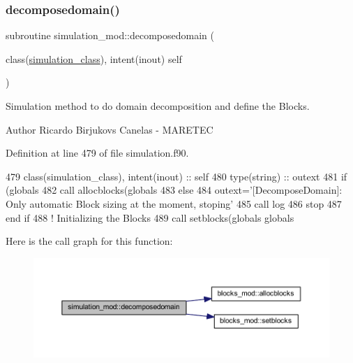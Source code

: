 \subsubsection{\texorpdfstring{decomposedomain()}{decomposedomain()}}
{\footnotesize\ttfamily subroutine simulation\+\_\+mod\+::decomposedomain (\begin{DoxyParamCaption}\item[{class(\mbox{\hyperlink{structsimulation__mod_1_1simulation__class}{simulation\+\_\+class}}), intent(inout)}]{self }\end{DoxyParamCaption})\hspace{0.3cm}{\ttfamily [private]}}



Simulation method to do domain decomposition and define the Blocks. 

\begin{DoxyAuthor}{Author}
Ricardo Birjukovs Canelas -\/ M\+A\+R\+E\+T\+EC 
\end{DoxyAuthor}


Definition at line 479 of file simulation.\+f90.


\begin{DoxyCode}
479     \textcolor{keywordtype}{class}(simulation\_class), \textcolor{keywordtype}{intent(inout)} :: self
480     \textcolor{keywordtype}{type}(string) :: outext
481     \textcolor{keywordflow}{if} (globals%
482         \textcolor{keyword}{call }allocblocks(globals%
483     \textcolor{keywordflow}{else}
484         outext=\textcolor{stringliteral}{'[DecomposeDomain]: Only automatic Block sizing at the moment, stoping'}
485         \textcolor{keyword}{call }log%
486         stop
487 \textcolor{keywordflow}{    end if}
488     \textcolor{comment}{! Initializing the Blocks}
489     \textcolor{keyword}{call }setblocks(globals%
      globals%
\end{DoxyCode}
Here is the call graph for this function\+:\nopagebreak
\begin{figure}[H]
\begin{center}
\leavevmode
\includegraphics[width=350pt]{namespacesimulation__mod_a2b8198a9fb3f7671c6b45192a0b9740c_cgraph}
\end{center}
\end{figure}
\mbox{\label{namespacesimulation__mod_a0ad485eab624ffa4df282f1da8d9f214}} 

